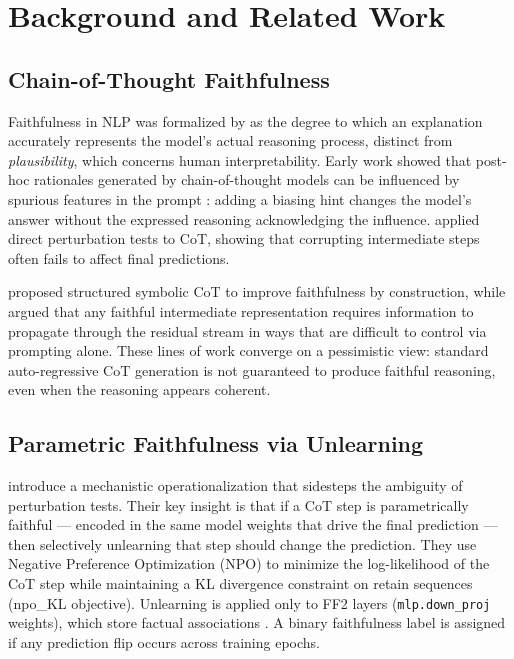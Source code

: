 \documentclass[11pt]{article}
\begin{document}
\section{Background and Related Work}
\label{sec:background}

\subsection{Chain-of-Thought Faithfulness}

Faithfulness in NLP was formalized by \citet{jacovi2020faithfully} as the
degree to which an explanation accurately represents the model's actual
reasoning process, distinct from \emph{plausibility}, which concerns human
interpretability. Early work showed that post-hoc rationales generated by
chain-of-thought models can be influenced by spurious features in the prompt
\citep{turpin2023faithfulness}: adding a biasing hint changes the model's
answer without the expressed reasoning acknowledging the influence.
\citet{lanham2023measuring} applied direct perturbation tests to CoT, showing
that corrupting intermediate steps often fails to affect final predictions.

\citet{lyu2023faithful} proposed structured symbolic CoT to improve
faithfulness by construction, while \citet{prystawski2024think} argued that
any faithful intermediate representation requires information to propagate
through the residual stream in ways that are difficult to control via
prompting alone. These lines of work converge on a pessimistic view: standard
auto-regressive CoT generation is not guaranteed to produce faithful
reasoning, even when the reasoning appears coherent.

\subsection{Parametric Faithfulness via Unlearning}

\citet{tutek2025faithfulness} introduce a mechanistic operationalization that
sidesteps the ambiguity of perturbation tests. Their key insight is that if a
CoT step is parametrically faithful --- encoded in the same model weights that
drive the final prediction --- then selectively unlearning that step should
change the prediction. They use Negative Preference Optimization (NPO)
\citep{zhang2024negative} to minimize the log-likelihood of the CoT step
while maintaining a KL divergence constraint on retain sequences (npo\_KL
objective). Unlearning is applied only to FF2 layers (\texttt{mlp.down\_proj}
weights), which store factual associations \citep{meng2022rome}. A binary
faithfulness label is assigned if any prediction flip occurs across training
epochs.
\end{document}
